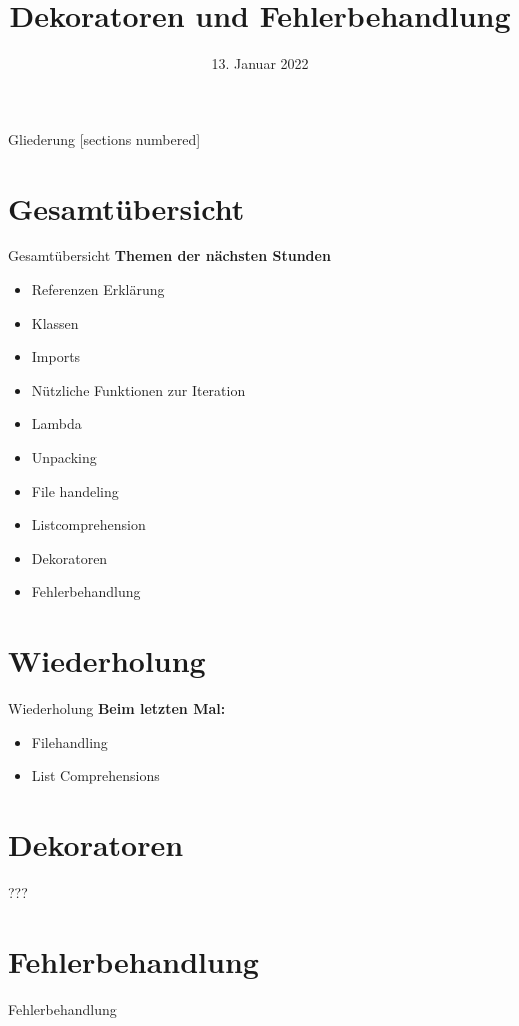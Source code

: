 



\title{Dekoratoren und Fehlerbehandlung}
\date{13. Januar 2022}


	
\maketitle

\begin{frame}{Gliederung}
	[sections numbered]
	\tableofcontents
\end{frame}

\section*{Gesamtübersicht}
\begin{frame}{Gesamtübersicht}
	\textbf{Themen der nächsten Stunden}
	\begin{itemize}
		\item Referenzen Erklärung
		\item  Klassen
		\item Imports
		\item Nützliche Funktionen zur Iteration
		\item Lambda
		\item Unpacking
		\item File handeling
		\item Listcomprehension
		\item \alert{Dekoratoren}
		\item \alert{Fehlerbehandlung}
	\end{itemize}
\end{frame}

\section{Wiederholung}
\begin{frame}{Wiederholung}
	\textbf{Beim letzten Mal:}
	\begin{itemize}
		\item Filehandling
		
		\item List Comprehensions
		
	\end{itemize}	
\end{frame}

\section{Dekoratoren}
\begin{frame}{???}
	
\end{frame}

\section{Fehlerbehandlung}
\begin{frame}{Fehlerbehandlung}
	
\end{frame}


